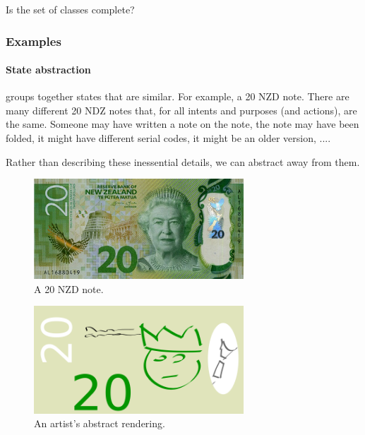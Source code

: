 {\color{red}Is the set of classes complete?}




\subsubsection{Examples}

\paragraph{State abstraction} groups together states that are similar. For example, a 20 NZD note.
There are many different 20 NDZ notes that, for all intents and purposes (and actions), are the same.
Someone may have written a note on the note, the note may have been folded,
it might have different serial codes, it might be an older version, ....

Rather than describing these inessential details, we can abstract away from them.

\begin{figure}[h!]
\centering
\includegraphics[width=0.7\textwidth,height=0.2\textheight]{../../pictures/images/nz20.png}
\caption{A 20 NZD note.}
\end{figure}

\begin{figure}[h!]
\centering
\includegraphics[width=0.7\textwidth,height=0.2\textheight]{../../pictures/drawings/my-nz20.png}
\caption{An artist's abstract rendering.}
\end{figure}

